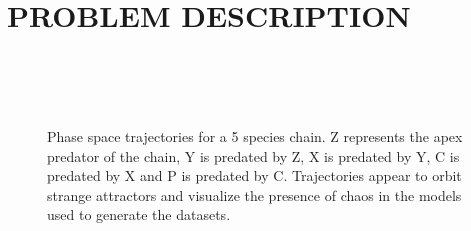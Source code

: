 \documentclass[letterpaper, 10 pt, conference]{ieeeconf}  %
\begin{document}
\section{PROBLEM DESCRIPTION}
\begin{figure}
  \centering
  \\
  \\
  \\
  \caption{\label{ref_label_overall}Phase space trajectories for a 5 species chain. Z represents the apex predator of the chain, Y is predated by Z, X is predated by Y, C is predated by X and P is predated by C. Trajectories appear to orbit strange attractors and visualize the presence of chaos in the models used to generate the datasets.}
\end{figure}
\end{document}
